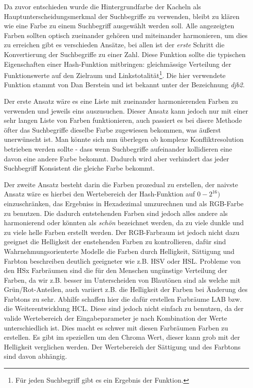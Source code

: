 \documentclass[12pt,twoside]{book}
\begin{document}
Da zuvor entschieden wurde die Hintergrundfarbe der Kacheln als Hauptunterscheidungsmerkmal der Suchbegriffe zu verwenden, bleibt zu klären wie eine Farbe zu einem Suchbegriff ausgewählt werden soll.
Alle angezeigten Farben sollten optisch zueinander gehören und miteinander harmonieren, um dies zu erreichen gibt es verschieden Ansätze, bei allen ist der \textit{erste} Schritt die Konvertierung der Suchbegriffe zu einer Zahl. Diese Funktion sollte die typischen Eigenschaften einer  Hash-Funktion mitbringen: gleichmässige Verteilung der Funktionswerte auf den Zielraum und Linkstotalität\footnote{Für jeden Suchbegriff gibt es ein Ergebnis der Funktion.}.
Die hier verwendete Funktion stammt von Dan Berstein und ist bekannt unter der Bezeichnung \textit{djb2}.

Der erste Ansatz wäre es eine Liste mit zueinander harmonierenden Farben zu verwenden und jeweils eins auszusuchen. Dieser Ansatz kann jedoch nur mit einer sehr langen Liste von Farben funktionieren, auch passiert es bei disere Methode öfter das Suchbegriffe dieselbe Farbe zugewiesen bekommen, was äußerst unerwünscht ist. Man könnte sich nun überlegen ob komplexe Konfliktresolution betrieben werden sollte - dass wenn Suchbegriffe aufeinander kollidieren eine davon eine andere Farbe bekommt.
Dadurch wird aber verhindert das jeder Suchbegriff Konsistent die gleiche Farbe bekommt.

Der zweite Ansatz besteht darin die Farben prozedual zu erstellen,
der naivste Ansatz wäre es hierbei den Wertebereich der Hash-Funktion auf $0 - 2^{16})$ einzuschränken, das Ergebniss in Hexadezimal umzurechnen und als RGB-Farbe zu benutzen. Die dadurch entstehenden Farben sind jedoch alles andere als harmonierend oder könnten als \textit{schön} bezeichnet werden, da zu viele dunkle und zu viele helle Farben erstellt werden. Der RGB-Farbraum ist jedoch nicht dazu geeignet die Helligkeit der enstehenden Farben zu kontrollieren, dafür sind Wahrnehmungsorienterte Modelle die Farben durch Helligkeit, Sättigung und Farbton beschreiben deutlich geeigneter wie z.B. HSV oder HSL.
Probleme von den HSx Farbräumen sind die für den Menschen ungünstige Verteilung der Farben, da wir z.B. besser im Unterscheiden von Blautönen sind als welche mit Grün/Rot-Anteilen, auch variiert z.B. die Helligkeit der Farben bei Änderung des Farbtons zu sehr.
Abhilfe schaffen hier die dafür erstellen Farbräume LAB bzw. die Weiterentwicklung HCL. Diese sind jedoch nicht einfach zu benutzen, da der valide Wertebereich der Eingabeparameter je nach Kombination der Werte unterschiedlich ist. Dies macht es schwer mit diesen Farbräumen
Farben zu erstellen. Es gibt im speziellen um den Chroma Wert, dieser kann grob mit der Helligkeit verglichen werden. Der Wertebereich der Sättigung und des Farbtons sind davon abhängig.
\end{document}
